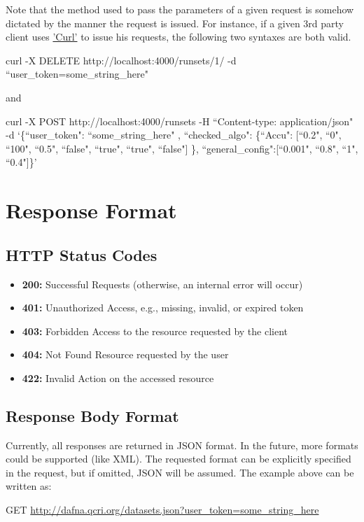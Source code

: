 \documentclass[a4paper,10pt]{scrartcl}
\begin{document}
Note that the method used to pass the parameters of a given request is somehow dictated by the manner the request is issued.
For instance, if a given 3rd party client uses
\href{http://curl.haxx.se/}{'Curl'} to issue his requests, the following two syntaxes are both valid.
\begin{description}
 \item curl -X DELETE http://localhost:4000/runsets/1/ -d ``user\_token=some\_string\_here"\\
 \item and \\
 \item curl -X POST http://localhost:4000/runsets -H ``Content-type: application/json" -d `\{``user\_token": ``some\_string\_here" , ``checked\_algo": \{``Accu": [``0.2", ``0", ``100", ``0.5", ``false", ``true", ``true", ``false"] \}, ``general\_config":[``0.001", ``0.8", ``1", ``0.4"]\}' 
\end{description}
\section{Response Format}
\subsection{HTTP Status Codes}
\begin{itemize}
 \item \textbf{200:} Successful Requests (otherwise, an internal error will occur)
 \item \textbf{401:} Unauthorized Access, e.g., missing, invalid, or expired token
 \item \textbf{403:} Forbidden Access to the resource requested by the client
 \item \textbf{404:} Not Found Resource requested by the user
 \item \textbf{422:} Invalid Action on the accessed resource
 
\end{itemize}

\subsection{Response Body Format}
Currently, all responses are returned in JSON format. In the future, more formats could be 
supported (like XML). The requested format can be explicitly specified in the request, but if omitted,
JSON will be assumed. The example above can be written as:
\begin{description}
 \item GET \href{http://dafna.qcri.org/datasets.json?user\_token=some\_string\_here}{http://dafna.qcri.org/datasets.json?user\_token=some\_string\_here}
\end{description}
\end{document}
